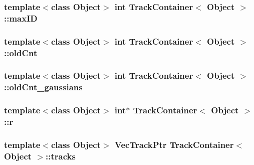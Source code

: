 \hypertarget{class_track_container_a55b104a8da7c9c6bf1fdaa3057c344d2}{
\subsubsection[{max\-I\-D}]{\setlength{\rightskip}{0pt plus 5cm}template$<$class \-Object$>$ int {\bf \-Track\-Container}$<$ \-Object $>$\-::{\bf max\-I\-D}}}\label{class_track_container_a55b104a8da7c9c6bf1fdaa3057c344d2}
\hypertarget{class_track_container_a6c01352d78062d345f86ba6fc434717a}{
\subsubsection[{old\-Cnt}]{\setlength{\rightskip}{0pt plus 5cm}template$<$class \-Object$>$ int {\bf \-Track\-Container}$<$ \-Object $>$\-::{\bf old\-Cnt}}}\label{class_track_container_a6c01352d78062d345f86ba6fc434717a}
\hypertarget{class_track_container_a797563af78394ee7a5f65db38d2ad987}{
\subsubsection[{old\-Cnt\-\_\-gaussians}]{\setlength{\rightskip}{0pt plus 5cm}template$<$class \-Object$>$ int {\bf \-Track\-Container}$<$ \-Object $>$\-::{\bf old\-Cnt\-\_\-gaussians}}}\label{class_track_container_a797563af78394ee7a5f65db38d2ad987}
\hypertarget{class_track_container_af38637116045868dc48feeddb2310f46}{
\subsubsection[{r}]{\setlength{\rightskip}{0pt plus 5cm}template$<$class \-Object$>$ int$\ast$ {\bf \-Track\-Container}$<$ \-Object $>$\-::{\bf r}}}\label{class_track_container_af38637116045868dc48feeddb2310f46}
\hypertarget{class_track_container_af2e81ac6619a2a6cdf631561c8287dbd}{
\subsubsection[{tracks}]{\setlength{\rightskip}{0pt plus 5cm}template$<$class \-Object$>$ {\bf \-Vec\-Track\-Ptr} {\bf \-Track\-Container}$<$ \-Object $>$\-::{\bf tracks}}}\label{class_track_container_af2e81ac6619a2a6cdf631561c8287dbd}


